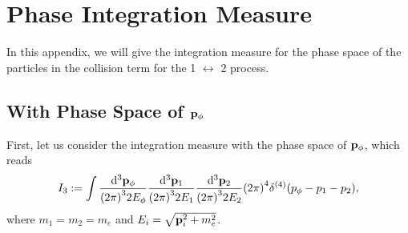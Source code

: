 \documentclass{article}
\begin{document}
    \section{Phase Integration Measure}
        In this appendix, we will give the integration measure for the phase space of the particles in the collision term for the 1 $\leftrightarrow$ 2 process.

        \subsection{With Phase Space of \texorpdfstring{$\vb{p}_\phi$}{p\_φ}}
            First, let us consider the integration measure with the phase space of $\vb{p}_\phi$, which reads
            \begin{equation}
                I_3 := \int \frac{\dd[3]{\vb{p}_\phi}}{\qty(2 \pi)^3 2 E_\phi} \frac{\dd[3]{\vb{p}_1}}{\qty(2 \pi)^3 2 E_1} \frac{\dd[3]{\vb{p}_2}}{\qty(2 \pi)^3 2 E_2} \qty(2 \pi)^4 \delta^{(4)}\qty(p_\phi - p_1 - p_2),
            \end{equation}
            where $m_1 = m_2 = m_e$ and $E_i = \sqrt{\vb{p}_i^2 + m_e^2}$.
\end{document}
